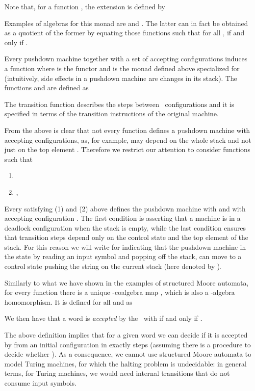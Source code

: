 \documentclass{LMCS}
\begin{document}
Note that, for a function , the extension  is defined by

Examples of algebras for this monad are  and . The latter can in fact
be obtained as a quotient of the former by equating those functions 
such that for all ,  if and only if .

Every pushdown machine  together with a set of accepting configurations 
induces a function  where  is  the functor  and
 is the monad defined above specialized for  (intuitively, side effects in a pushdown machine
are changes in its stack). The functions  and  are defined as

The transition function  describes the steps between \pda\ configurations and it is specified in
terms of the transition instructions  of the original machine.

From the above is clear that not every function  defines a pushdown
machine with accepting configurations, as, for example,  may depend on the whole stack  and not just on
the top element . Therefore we restrict our attention to consider functions
 such that
\begin{enumerate}[(1)]
\item 
\item ,
\end{enumerate}
Every  satisfying (1) and (2) above defines the pushdown machine  with
 and with accepting configuration .
The first condition is asserting that a machine is in a deadlock configuration when the stack is empty,
while the last condition ensures that transition steps depend only on the control state
and the top element of the stack. For this reason we will write 
for  indicating that the pushdown machine in the state  by reading an
input symbol  and popping  off the stack, can move to a control state  pushing the string
 on the current stack (here denoted by ).






Similarly to what we have shown in the examples of structured Moore automata, for every function
 there is a unique -coalgebra map ,
which is also a -algebra homomorphism. It is defined for all  and  as

We then have that a word  is \emph{accepted} by the \pda\  with  if
and only if . 

\smallskip

The above definition implies that for a given word  we can decide
if it is accepted by  from an initial configuration 
in exactly  steps (assuming there is a procedure to decide whether ). As a consequence, we cannot
use structured Moore automata to model Turing machines, for which the halting problem is undecidable: in general terms, 
for Turing machines, we would need internal transitions that do not consume input symbols.
\end{document}
